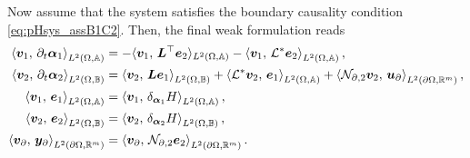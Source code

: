 Now assume that the system satisfies the boundary causality condition \eqref{eq:pHsys_assB1C2}. Then, the final weak formulation reads
\begin{equation}\label{eq:weak_sys_intJ2}
\begin{aligned}
\inner[L^2(\Omega, \mathbb{A})]{\bm{v}_1}{\partial_t \bm{\alpha}_1} &=   -  \langle{\bm{v}_1}, \,{\bm{L}^\top \bm{e}_2}\rangle_{L^2(\Omega, \mathbb{A})}  -\inner[L^2(\Omega, \mathbb{A})]{\bm{v}_1}{\mathcal{L}^*\bm{e}_2}, \\
\inner[L^2(\Omega, \mathbb{B})]{\bm{v}_2}{\partial_t \bm{\alpha}_2} &=   \inner[L^2(\Omega, \mathbb{B})]{\bm{v}_2}{\bm{L}\bm{e}_1}  + \inner[L^2(\Omega, \mathbb{A})]{\mathcal{L}^*\bm{v}_2}{\bm{e}_1} + \inner[L^2(\partial \Omega, \mathbb{R}^m)]{\mathcal{N}_{\partial, 2} \bm{v}_2}{\bm{u}_{\partial}}, \\
\inner[L^2(\Omega, \mathbb{A})]{\bm{v}_1}{\bm{e}_1}&= \inner[L^2(\Omega, \mathbb{A})]{\bm{v}_1}{\delta_{\bm{\alpha}_1} H}, \\
\inner[L^2(\Omega, \mathbb{B})]{\bm{v}_2}{\bm{e}_2}&= \inner[L^2(\Omega, \mathbb{B})]{\bm{v}_2}{\delta_{\bm{\alpha}_2} H}, \\
\inner[L^2(\partial \Omega, \mathbb{R}^m)]{\bm{v}_\partial}{\bm{y}_\partial} &= \inner[L^2(\partial \Omega, \mathbb{R}^m)]{\bm{v}_\partial}{\mathcal{N}_{\partial, 2}\bm{e}_2}.
\end{aligned}
\end{equation}

